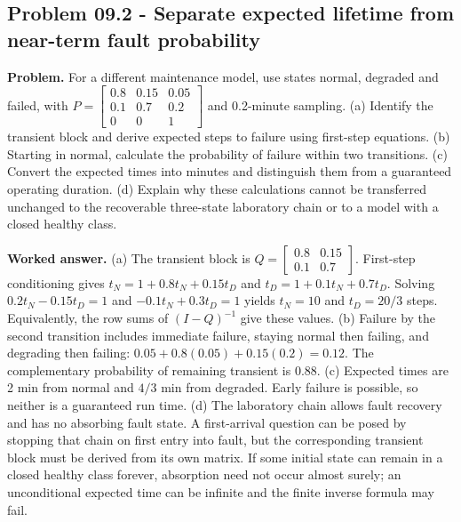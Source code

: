 \documentclass[11pt,a4paper]{article}
\begin{document}
\subsection{Problem 09.2 - Separate expected lifetime from near-term fault probability}
\textbf{Problem.} For a different maintenance model, use states normal, degraded and failed, with $P=\left[\begin{smallmatrix}0.8&0.15&0.05\\0.1&0.7&0.2\\0&0&1\end{smallmatrix}\right]$ and 0.2-minute sampling. (a) Identify the transient block and derive expected steps to failure using first-step equations. (b) Starting in normal, calculate the probability of failure within two transitions. (c) Convert the expected times into minutes and distinguish them from a guaranteed operating duration. (d) Explain why these calculations cannot be transferred unchanged to the recoverable three-state laboratory chain or to a model with a closed healthy class.


\textbf{Worked answer.} (a) The transient block is $Q=\left[\begin{smallmatrix}0.8&0.15\\0.1&0.7\end{smallmatrix}\right]$. First-step conditioning gives $t_N=1+0.8t_N+0.15t_D$ and $t_D=1+0.1t_N+0.7t_D$. Solving $0.2t_N-0.15t_D=1$ and $-0.1t_N+0.3t_D=1$ yields $t_N=10$ and $t_D=20/3$ steps. Equivalently, the row sums of $(I-Q)^{-1}$ give these values. (b) Failure by the second transition includes immediate failure, staying normal then failing, and degrading then failing: $0.05+0.8(0.05)+0.15(0.2)=0.12$. The complementary probability of remaining transient is 0.88. (c) Expected times are 2 min from normal and $4/3$ min from degraded. Early failure is possible, so neither is a guaranteed run time. (d) The laboratory chain allows fault recovery and has no absorbing fault state. A first-arrival question can be posed by stopping that chain on first entry into fault, but the corresponding transient block must be derived from its own matrix. If some initial state can remain in a closed healthy class forever, absorption need not occur almost surely; an unconditional expected time can be infinite and the finite inverse formula may fail.
\end{document}
